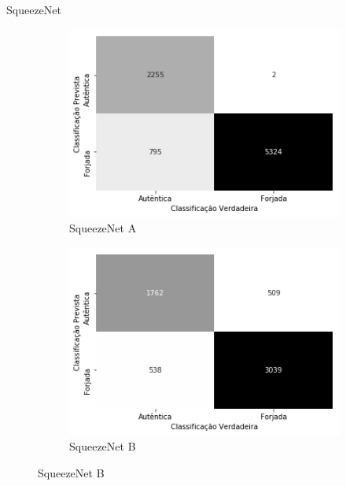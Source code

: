 \begin{frame}{SqueezeNet}
  \baselineskip
  \begin{figure}[ht!]
    \caption{Matrizes de confusão dos modelos obtidos com a arquitetura SqueezeNet.}\label{fig:matrizes-lenet}
    \begin{subfigure}{0.4\linewidth}
      \caption{SqueezeNet A}
      \includegraphics[width=\linewidth]{img/matriz-squeezenet-a}
    \end{subfigure}
    \hspace{2cm}
    \begin{subfigure}{0.4\linewidth}
      \caption{SqueezeNet B}
      \includegraphics[width=\linewidth]{img/matriz-squeezenet-b}%
    \end{subfigure}
\end{figure}
\end{frame}

